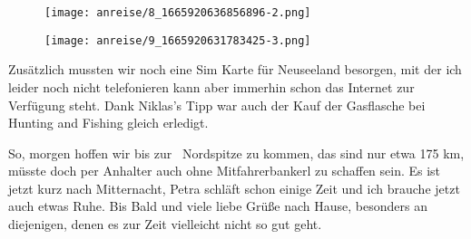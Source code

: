 \begin{figure}[H]
	\centering
	\texttt{[image: anreise/8\_1665920636856896-2.png]}
	\caption{}
	\label{fig:8_1665920636856896-2}
\end{figure}

\begin{figure}[H]
	\centering
	\texttt{[image: anreise/9\_1665920631783425-3.png]}
	\caption{}
	\label{fig:9_1665920631783425-3}
\end{figure}

  Zusätzlich mussten wir noch eine Sim Karte für Neuseeland besorgen, mit der ich leider noch nicht telefonieren kann aber immerhin schon das Internet zur Verfügung steht. Dank Niklas's Tipp war auch der Kauf der Gasflasche bei Hunting and Fishing gleich erledigt.
 


  So, morgen hoffen wir bis zur  Nordspitze zu kommen, das sind nur etwa 175 km, müsste doch per Anhalter auch ohne Mitfahrerbankerl zu schaffen sein. Es ist jetzt kurz nach Mitternacht, Petra schläft schon einige Zeit und ich brauche jetzt auch etwas Ruhe. Bis Bald und viele liebe Grüße nach Hause, besonders an diejenigen, denen es zur Zeit vielleicht nicht so gut geht.
 

